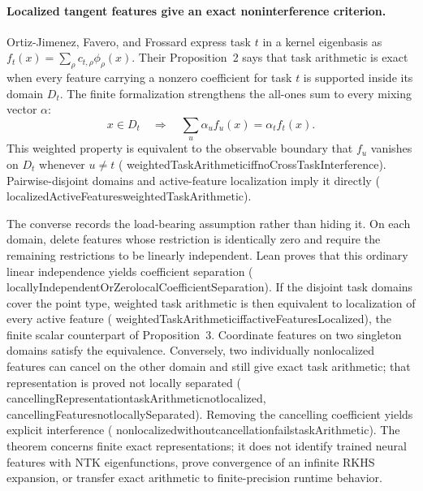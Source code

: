 \documentclass[11pt]{article}
\newcommand{\leanname}[1]{{\scriptsize\ttfamily
  \def\_{\textunderscore\allowbreak}#1}}
\begin{document}
\paragraph{Localized tangent features give an exact noninterference criterion.}
Ortiz-Jimenez, Favero, and Frossard
\cite{ortizjimenez2023task} express task $t$ in a kernel eigenbasis as
$f_t(x)=\sum_\rho c_{t,\rho}\phi_\rho(x)$. Their Proposition~2 says that
task arithmetic is exact when every feature carrying a nonzero coefficient
for task $t$ is supported inside its domain $D_t$. The finite formalization
strengthens the all-ones sum to every mixing vector $\alpha$:
\[
 x\in D_t
 \quad\Longrightarrow\quad
 \sum_u\alpha_u f_u(x)=\alpha_t f_t(x).
\]
This weighted property is equivalent to the observable boundary that
$f_u$ vanishes on $D_t$ whenever $u\ne t$
(\leanname{weightedTaskArithmetic\_iff\_noCrossTaskInterference}).
Pairwise-disjoint domains and active-feature localization imply it directly
(\leanname{localizedActiveFeatures\_weightedTaskArithmetic}).

The converse records the load-bearing assumption rather than hiding it.
On each domain, delete features whose restriction is identically zero and
require the remaining restrictions to be linearly independent. Lean proves
that this ordinary linear independence yields coefficient separation
(\leanname{locallyIndependentOrZero\_localCoefficientSeparation}).
If the disjoint task domains cover the point type, weighted task arithmetic
is then equivalent to localization of every active feature
(\leanname{weightedTaskArithmetic\_iff\_activeFeaturesLocalized}), the finite
scalar counterpart of Proposition~3. Coordinate features on two singleton
domains satisfy the equivalence. Conversely, two individually nonlocalized
features can cancel on the other domain and still give exact task arithmetic;
that representation is proved not locally separated
(\leanname{cancellingRepresentation\_taskArithmetic\_not\_localized},
\leanname{cancellingFeatures\_not\_locallySeparated}). Removing the cancelling
coefficient yields explicit interference
(\leanname{nonlocalized\_without\_cancellation\_fails\_taskArithmetic}).
The theorem concerns finite exact representations; it does not identify
trained neural features with NTK eigenfunctions, prove convergence of an
infinite RKHS expansion, or transfer exact arithmetic to finite-precision
runtime behavior.
\end{document}
